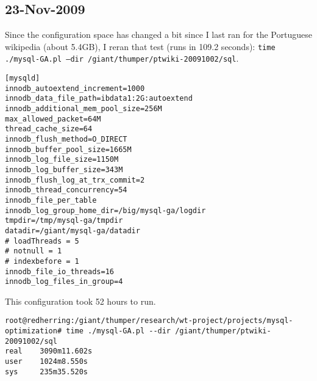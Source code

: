 \subsection{23-Nov-2009}

Since the configuration space has changed a bit since I last ran for
the Portuguese wikipedia (about 5.4GB), I reran that test (runs in 109.2 seconds):
\texttt{time ./mysql-GA.pl --dir /giant/thumper/ptwiki-20091002/sql}.

\begin{verbatim}
[mysqld]
innodb_autoextend_increment=1000
innodb_data_file_path=ibdata1:2G:autoextend
innodb_additional_mem_pool_size=256M
max_allowed_packet=64M
thread_cache_size=64
innodb_flush_method=O_DIRECT
innodb_buffer_pool_size=1665M
innodb_log_file_size=1150M
innodb_log_buffer_size=343M
innodb_flush_log_at_trx_commit=2
innodb_thread_concurrency=54
innodb_file_per_table
innodb_log_group_home_dir=/big/mysql-ga/logdir
tmpdir=/tmp/mysql-ga/tmpdir
datadir=/giant/mysql-ga/datadir
# loadThreads = 5
# notnull = 1
# indexbefore = 1
innodb_file_io_threads=16
innodb_log_files_in_group=4
\end{verbatim}

This configuration took 52 hours to run.
\begin{verbatim}
root@redherring:/giant/thumper/research/wt-project/projects/mysql-optimization# time ./mysql-GA.pl --dir /giant/thumper/ptwiki-20091002/sql
real    3090m11.602s
user    1024m8.550s
sys     235m35.520s
\end{verbatim}

